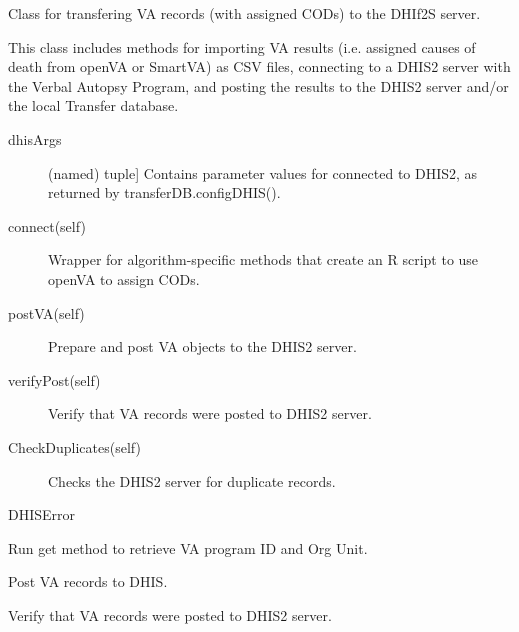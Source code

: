 \documentclass[letterpaper,12pt,english]{sphinxmanual}
\begin{document}
\begin{fulllineitems}
\label{\detokenize{help:dhis.DHIS}}
Class for transfering VA records (with assigned CODs) to the DHIf2S server.

This class includes methods for importing VA results (i.e. assigned causes of
death from openVA or SmartVA) as CSV files, connecting to a DHIS2 server
with the Verbal Autopsy Program, and posting the results to the DHIS2
server and/or the local Transfer database.
\begin{description}
\item[{dhisArgs}] \leavevmode{[}(named) tuple{]}
Contains parameter values for connected to DHIS2, as returned by
transferDB.configDHIS().

\end{description}
\begin{description}
\item[{connect(self)}] \leavevmode
Wrapper for algorithm-specific methods that create an R script to use
openVA to assign CODs.

\item[{postVA(self)}] \leavevmode
Prepare and post VA objects to the DHIS2 server.

\item[{verifyPost(self)}] \leavevmode
Verify that VA records were posted to DHIS2 server.

\item[{CheckDuplicates(self)}] \leavevmode
Checks the DHIS2 server for duplicate records.

\end{description}

DHISError

\begin{fulllineitems}
\label{\detokenize{help:dhis.DHIS.connect}}
Run get method to retrieve VA program ID and Org Unit.

\end{fulllineitems}


\begin{fulllineitems}
\label{\detokenize{help:dhis.DHIS.postVA}}
Post VA records to DHIS.

\end{fulllineitems}


\begin{fulllineitems}
\label{\detokenize{help:dhis.DHIS.verifyPost}}
Verify that VA records were posted to DHIS2 server.

\end{fulllineitems}


\end{fulllineitems}
\end{document}
